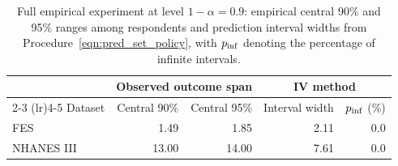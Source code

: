 \begin{table}[!htbp]
\centering\footnotesize
\setlength{\tabcolsep}{5pt}
\begin{tabular}{lrrrr}
\toprule\footnotesize
& \multicolumn{2}{c}{Observed outcome span} & \multicolumn{2}{c}{IV method} \\
\cmidrule(lr){2-3} \cmidrule(lr){4-5}
Dataset & Central 90\% & Central 95\% & Interval width & $p_{\rm inf}$ (\%) \\
\midrule
FES & 1.49 & 1.85 & 2.11 & 0.0 \\
NHANES III & 13.00 & 14.00 & 7.61 & 0.0 \\
\bottomrule
\end{tabular}
\caption{\footnotesize Full empirical experiment at level $1-\alpha=0.9$: empirical central 90\% and 95\% ranges among respondents and prediction interval widths from Procedure~\eqref{eqn:pred_set_policy}, with $p_{\rm inf}$ denoting the percentage of infinite intervals.}
\label{tab:empirical-application}
\end{table}
